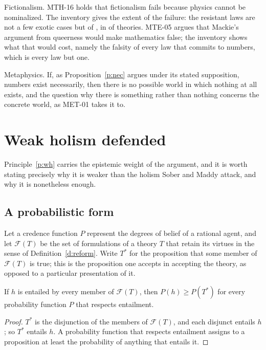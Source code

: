 \documentclass{situationist-preprint}
\begin{document}
Fictionalism. MTH-16 holds that fictionalism fails because physics cannot be nominalized. The inventory gives the extent of the failure: the resistant laws are not a few exotic cases but \nResistant{} of \nLaws, in \nResTheories{} of \nTheories{} theories. MTE-05 argues that Mackie's argument from queerness would make mathematics false; the inventory shows what that would cost, namely the falsity of every law that commits to numbers, which is every law but one.

Metaphysics. If, as Proposition~\ref{p:nec} argues under its stated supposition, numbers exist necessarily, then there is no possible world in which nothing at all exists, and the question why there is something rather than nothing concerns the concrete world, as MET-01 takes it to.

\section{Weak holism defended}\label{s:wh}

Principle~\ref{p:wh} carries the epistemic weight of the argument, and it is worth stating precisely why it is weaker than the holism Sober and Maddy attack, and why it is nonetheless enough.

\subsection{A probabilistic form}

Let a credence function $P$ represent the degrees of belief of a rational agent, and let $\mathcal F(T)$ be the set of formulations of a theory $T$ that retain its virtues in the sense of Definition~\ref{d:reform}. Write $T^*$ for the proposition that some member of $\mathcal F(T)$ is true; this is the proposition one accepts in accepting the theory, as opposed to a particular presentation of it.

\begin{proposition}\label{p:prob}
If $h$ is entailed by every member of $\mathcal F(T)$, then $P(h) \geq P(T^*)$ for every probability function $P$ that respects entailment.
\end{proposition}

\begin{proof}
$T^*$ is the disjunction of the members of $\mathcal F(T)$, and each disjunct entails $h$; so $T^*$ entails $h$. A probability function that respects entailment assigns to a proposition at least the probability of anything that entails it.
\end{proof}
\end{document}
